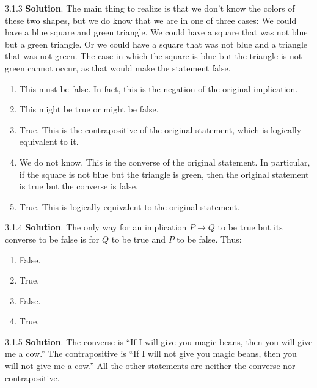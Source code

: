 \documentclass[11pt,]{book}
\theoremstyle{ptxplainnotitle}
\theoremstyle{ptxplaintitle}
\theoremstyle{ptxdefinitionnotitle}
\theoremstyle{ptxdefinitiontitle}
\theoremstyle{ptxdefinitionnotitle}
\theoremstyle{ptxdefinitiontitle}
\theoremstyle{ptxdefinitionnotitle}
\theoremstyle{ptxdefinitiontitle}
\theoremstyle{ptxdefinitiontitlenonumber}
\theoremstyle{ptxdefinitiontitlenonumber}
\numberwithin{equation}{chapter}
\newcommand{\imp}{\rightarrow}
\begin{document}
\begin{divisionexercise}{3.1.3}
\textbf{Solution}.\quad%
\hypertarget{p-1897}{}%
The main thing to realize is that we don't know the colors of these two shapes, but we do know that we are in one of three cases: We could have a blue square and green triangle.  We could have a square that was not blue but a green triangle.  Or we could have a square that was not blue and a triangle that was not green.  The case in which the square is blue but the triangle is not green cannot occur, as that would make the statement false. \leavevmode%
\begin{enumerate}[label=\alph*.]
\item\hypertarget{li-867}{}\hypertarget{p-1898}{}%
This must be false.  In fact, this is the negation of the original implication.%
\item\hypertarget{li-868}{}\hypertarget{p-1899}{}%
This might be true or might be false.%
\item\hypertarget{li-869}{}\hypertarget{p-1900}{}%
True.  This is the contrapositive of the original statement, which is logically equivalent to it.%
\item\hypertarget{li-870}{}\hypertarget{p-1901}{}%
We do not know.  This is the converse of the original statement.  In particular, if the square is not blue but the triangle is green, then the original statement is true but the converse is false.%
\item\hypertarget{li-871}{}\hypertarget{p-1902}{}%
True.  This is logically equivalent to the original statement.%
\end{enumerate}
%
\end{divisionexercise}%
\begin{divisionexercise}{3.1.4}
\textbf{Solution}.\quad%
\hypertarget{p-1934}{}%
The only way for an implication \(P\imp Q\) to be true but its converse to be false is for \(Q\) to be true and \(P\) to be false.  Thus: \leavevmode%
\begin{enumerate}[label=\alph*.]
\item\hypertarget{li-900}{}\hypertarget{p-1935}{}%
False.%
\item\hypertarget{li-901}{}\hypertarget{p-1936}{}%
True.%
\item\hypertarget{li-902}{}\hypertarget{p-1937}{}%
False.%
\item\hypertarget{li-903}{}\hypertarget{p-1938}{}%
True.%
\end{enumerate}
%
\end{divisionexercise}%
\begin{divisionexercise}{3.1.5}
\textbf{Solution}.\quad%
\hypertarget{p-1978}{}%
The converse is ``If I will give you magic beans, then you will give me a cow.''  The contrapositive is ``If I will not give you magic beans, then you will not give me a cow.''  All the other statements are neither the converse nor contrapositive.%
\end{divisionexercise}%
\end{document}
